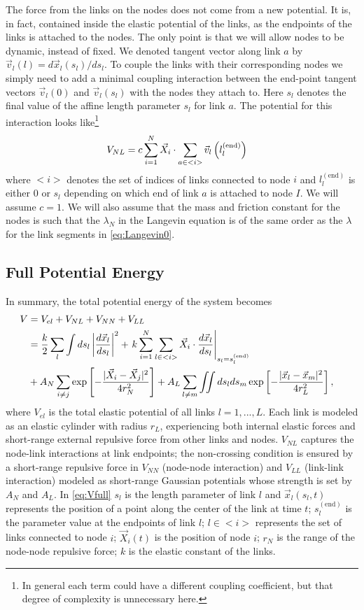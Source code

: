 \documentclass[nofootinbib,preprint,floatfix,titlepage,superscriptaddress]{revtex4} %
\begin{document}
The force from the links on the nodes does  not come from a new potential. 
It is, in fact, contained inside the elastic potential of the links, %
as the endpoints of the links is attached to the nodes. The only point is that we will allow nodes to be dynamic, instead of fixed. We denoted tangent vector along link $a$ by $\vec{v}_l(l) = d\vec{x}_l(s_l)/ds_l $. To couple the links with their corresponding nodes we simply need to add a minimal coupling interaction between the end-point tangent vectors $\vec{v}_l (0)$ and $\vec{v}_l (s_l)$ with the nodes they attach to. Here $s_l$ denotes the final value of the affine length parameter $s_l$ for link $a$. The potential for this interaction looks like\footnote{In general each term could have a different coupling coefficient, but that degree of complexity is unnecessary here.}
\begin{align}
   V_{NL} & =c\sum_{i=1}^N \vec{X}_i \cdot \sum_{a\in <i>}  \vec{v}_l\left(l^{(\mathrm{end})}_l\right)
\end{align}
where $<i>$ denotes the set of indices of links connected to node $i$ and $l^{(\mathrm{end})}_l$ is either $0$ or $s_l$ depending on which end of link $a$ is attached to node $I$. We will assume $c =1$. We will also assume that the mass and friction constant for the nodes is such that the $\lambda_N$ in the Langevin equation is of the same order as the $\lambda$ for the link segments in \eqref{eq:Langevin0}. 

\subsection{Full Potential Energy}
In summary, the total potential energy of the system becomes
\begin{align}
    V &= V_{el} + V_{NL} +V_{NN} + V_{LL} \cr 
    &= {k\over 2}\sum_l\int ds_l \left|{d\vec{x}_l\over ds_l} \right|^2 + 
    \left. k\sum_{i=1}^N  \sum_{l\in <i>}  \vec{X}_i \cdot{d\vec{x}_l%
    \over ds_l}\right|_{s_l = s_l^{(\mathrm{end})}}
    \cr
    &+ A_N\sum_{i\ne j}  \exp\left[- {|\vec{X}_i-\vec{X}_j|^2 \over 4r_N^2}\right]+A_L\sum_{l\ne m} \iint ds_lds_m 
    \exp\left[- {|\vec{x}_l-\vec{x}_m|^2 \over 4 r_L^2}\right] ,
 \label{eq:Vfull-red}
\end{align}
where $V_{el}$ is the total elastic potential of all links $l=1,...,L$. 
Each link is modeled as an elastic cylinder with radius $r_L$, experiencing both internal elastic forces and short-range external repulsive force from other links and nodes. $V_{NL}$ captures the node-link interactions at link endpoints;
the non-crossing condition is ensured by a short-range repulsive force in
$V_{NN}$  (node-node interaction)  and  $V_{LL}$ (link-link interaction) modeled as short-range Gaussian potentials whose strength is set by $A_N$ and $A_L$. 
In \eqref{eq:Vfull} $s_l$ is the length parameter of link $l$ and  $\vec{x}_l(s_l,t)$ represents the position of a point along the center of the link at time $t$;
$s_l^\mathrm{(end)}$ is the parameter value at the endpoints of link $l$;
$l\in <i>$ represents the set of links connected to node $i$; 
$\vec{X}_i(t)$ is the position of node $i$; $r_N$ is the range of the node-node repulsive force; $k$ is the elastic constant of the links.
\end{document}
